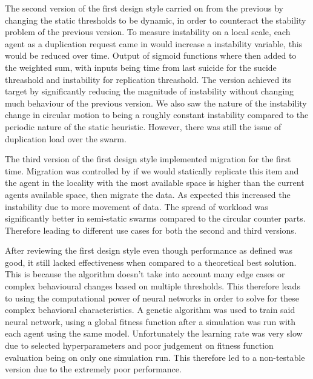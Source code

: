\documentclass{UoYCSproject}
\begin{document}
\begin{summary}
The second version of the first design style carried on from the previous by changing the static thresholds to be dynamic, in order to counteract the stability problem of the previous version. To measure instability on a local scale, each agent as a duplication request came in would increase a instability variable, this would be reduced over time. Output of sigmoid functions where then added to the weighted sum, with inputs being time from last suicide for the sucide threashold and instability for replication threashold. The version achieved its target by significantly reducing the magnitude of instability without changing much behaviour of the previous version. We also saw the nature of the instability change in circular motion to being a roughly constant instability compared to the periodic nature of the static heuristic. However, there was still the issue of duplication load over the swarm.

The third version of the first design style implemented migration for the first time. Migration was controlled by if we would statically replicate this item and the agent in the locality with the most available space is higher than the current agents available space, then migrate the data. As expected this increased the instability due to more movement of data. The spread of workload was significantly better in semi-static swarms compared to the circular counter parts. Therefore leading to different use cases for both the second and third versions.


After reviewing the first design style even though performance as defined was good, it still lacked effectiveness when compared to a theoretical best solution. This is because the algorithm doesn’t take into account many edge cases or complex behavioural changes based on multiple thresholds. This therefore leads to using the computational power of neural networks in order to solve for these complex behavioral characteristics. A genetic algorithm was used to train said neural network, using a global fitness function after a simulation was run with each agent using the same model. Unfortunately the learning rate was very slow due to selected hyperparameters and poor judgement on fitness function evaluation being on only one simulation run. This therefore led to a non-testable version due to the extremely poor performance.


\end{summary}
\end{document}
